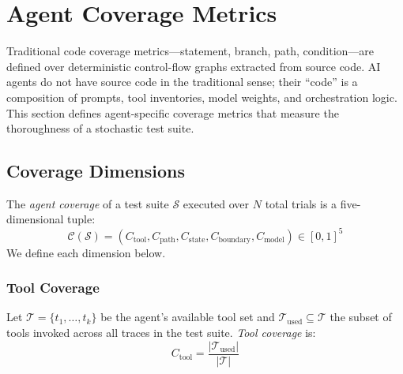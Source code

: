 
\section{Agent Coverage Metrics}
\label{sec:coverage}

Traditional code coverage metrics---statement, branch, path,
condition---are defined over deterministic control-flow graphs extracted
from source code. AI agents do not have source code in the traditional
sense; their ``code'' is a composition of prompts, tool inventories,
model weights, and orchestration logic. This section defines
agent-specific coverage metrics that measure the thoroughness of a
stochastic test suite.

\subsection{Coverage Dimensions}
\label{sec:coverage:dimensions}

\begin{definition}
\label{def:coverage-tuple}
The \emph{agent coverage} of a test suite $\mathcal{S}$ executed over
$N$ total trials is a five-dimensional tuple:
\begin{equation}
\label{eq:coverage-tuple}
  \mathcal{C}(\mathcal{S}) = (C_{\text{tool}}, C_{\text{path}},
    C_{\text{state}}, C_{\text{boundary}}, C_{\text{model}})
    \in [0,1]^5
\end{equation}
We define each dimension below.
\end{definition}

\subsubsection{Tool Coverage}
\label{sec:coverage:tool}

\begin{definition}
\label{def:tool-coverage}
Let $\mathcal{T} = \{t_1, \ldots, t_k\}$ be the agent's available tool
set and $\mathcal{T}_{\text{used}} \subseteq \mathcal{T}$ the subset of
tools invoked across all traces in the test suite. \emph{Tool coverage}
is:
\begin{equation}
\label{eq:tool-coverage}
  C_{\text{tool}} = \frac{|\mathcal{T}_{\text{used}}|}{|\mathcal{T}|}
\end{equation}
\end{definition}

